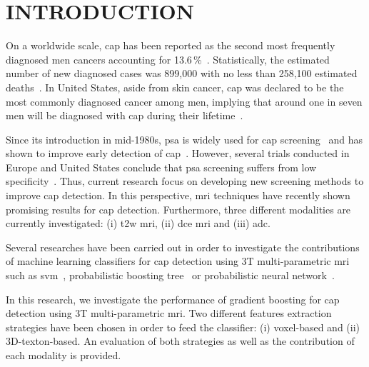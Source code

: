 \section{INTRODUCTION}\label{sec:introduction}

On a worldwide scale, \ac{cap} has been reported as the second most frequently diagnosed men cancers accounting for 13.6\,\%~\cite{Ferlay2010}. Statistically, the estimated number of new diagnosed cases was 899,000 with no less than 258,100 estimated deaths~\cite{Ferlay2010}. In United States, aside from skin cancer, \ac{cap} was declared to be the most commonly diagnosed cancer among men, implying that around one in seven men will be diagnosed with \ac{cap} during their lifetime~\cite{Siegel2014}.

Since its introduction in mid-1980s, \ac{psa} is widely used for \ac{cap} screening~\cite{Etzioni2002} and has shown to improve early detection of \ac{cap}~\cite{Chou2011}. However, several trials conducted in Europe and United States conclude that \ac{psa} screening suffers from low specificity~\cite{Andriole2009,Hugosson2010,Schroeder2012}. Thus, current research focus on developing new screening methods to improve \ac{cap} detection. In this perspective, \Ac{mri} techniques have recently shown promising results for \ac{cap} detection. Furthermore, three different modalities are currently investigated: (i) \ac{t2w} \ac{mri}, (ii) \ac{dce} \ac{mri} and (iii) \ac{adc}.

Several researches have been carried out in order to investigate the contributions of machine learning classifiers for \ac{cap} detection using 3T multi-parametric \ac{mri} such as \ac{svm}~\cite{Litjens2011,Litjens2012a,Litjens2014,Liu2013,Peng2013}, probabilistic boosting tree~\cite{Viswanath2011} or probabilistic neural network~\cite{Viswanath2011}.

In this research, we investigate the performance of gradient boosting for \ac{cap} detection using 3T multi-parametric \ac{mri}. Two different features extraction strategies have been chosen in order to feed the classifier: (i) voxel-based and (ii) 3D-texton-based. An evaluation of both strategies as well as the contribution of each modality is provided.

